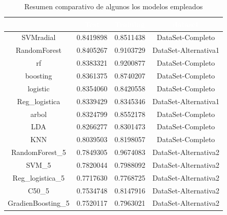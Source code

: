 \begin{table}[!h]
	
	\caption{\label{tab:cuadro_comparativo-modelos}Resumen comparativo de algunos los modelos empleados}
	\centering
	\begin{tabular}[t]{cccc}
		\toprule
		\rowcolor{black}  \multicolumn{1}{c}{\textcolor{white}{\textbf{object}}} & \multicolumn{1}{c}{\textcolor{white}{\textbf{Test}}} & \multicolumn{1}{c}{\textcolor{white}{\textbf{Training}}} & \multicolumn{1}{c}{\textcolor{white}{\textbf{dataset}}}\\
		\midrule
		\rowcolor{gray!6}  SVMradial & 0.8419898 & 0.8511438 & DataSet-Completo\\
		RandomForest & 0.8405267 & 0.9103729 & DataSet-Alternativa1\\
		\rowcolor{gray!6}  rf & 0.8383321 & 0.9200877 & DataSet-Completo\\
		boosting & 0.8361375 & 0.8740207 & DataSet-Completo\\
		\rowcolor{gray!6}  logistic & 0.8354060 & 0.8420558 & DataSet-Completo\\
		\addlinespace
		Reg\_logistica & 0.8339429 & 0.8345346 & DataSet-Alternativa1\\
		\rowcolor{gray!6}  arbol & 0.8324799 & 0.8552178 & DataSet-Completo\\
		LDA & 0.8266277 & 0.8301473 & DataSet-Completo\\
		\rowcolor{gray!6}  KNN & 0.8039503 & 0.8198057 & DataSet-Completo\\
		RandomForest\_5 & 0.7849305 & 0.9674083 & DataSet-Alternativa2\\
		\addlinespace
		\rowcolor{gray!6}  SVM\_5 & 0.7820044 & 0.7988092 & DataSet-Alternativa2\\
		Reg\_logistica\_5 & 0.7717630 & 0.7768725 & DataSet-Alternativa2\\
		\rowcolor{gray!6}  C50\_5 & 0.7534748 & 0.8147916 & DataSet-Alternativa2\\
		GradienBoosting\_5 & 0.7520117 & 0.7963021 & DataSet-Alternativa2\\
		\bottomrule
	\end{tabular}
\end{table}


